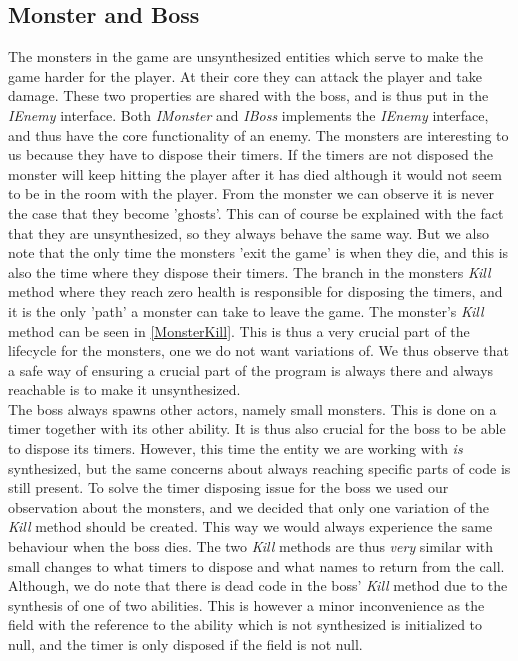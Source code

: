 \subsection{Monster and Boss}
The monsters in the game are unsynthesized entities which serve to make the game harder for the player. At their core they can attack the player and take damage. These two properties are shared with the boss, and is thus put in the \textit{IEnemy} interface. Both \textit{IMonster} and \textit{IBoss} implements the \textit{IEnemy} interface, and thus have the core functionality of an enemy. The monsters are interesting to us because they have to dispose their timers. If the timers are not disposed the monster will keep hitting the player after it has died although it would not seem to be in the room with the player. From the monster we can observe it is never the case that they become 'ghosts'. This can of course be explained with the fact that they are unsynthesized, so they always behave the same way. But we also note that the only time the monsters 'exit the game' is when they die, and this is also the time where they dispose their timers. The branch in the monsters \textit{Kill} method where they reach zero health is responsible for disposing the timers, and it is the only 'path' a monster can take to leave the game. The monster's \textit{Kill} method can be seen in \autoref{MonsterKill}. This is thus a very crucial part of the lifecycle for the monsters, one we do not want variations of. We thus observe that a safe way of ensuring a crucial part of the program is always there and always reachable is to make it unsynthesized.\\
The boss always spawns other actors, namely small monsters. This is done on a timer together with its other ability. It is thus also crucial for the boss to be able to dispose its timers. However, this time the entity we are working with \textit{is} synthesized, but the same concerns about always reaching specific parts of code is still present. To solve the timer disposing issue for the boss we used our observation about the monsters, and we decided that only one variation of the \textit{Kill} method should be created. This way we would always experience the same behaviour when the boss dies. The two \textit{Kill} methods are thus \textit{very} similar with small changes to what timers to dispose and what names to return from the call. Although, we do note that there is dead code in the boss' \textit{Kill} method due to the synthesis of one of two abilities. This is however a minor inconvenience as the field with the reference to the ability which is not synthesized is initialized to null, and the timer is only disposed if the field is not null.
